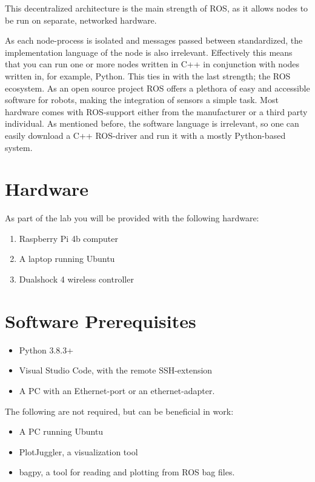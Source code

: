 \documentclass{ol-softwaremanual}
\begin{document}
This decentralized architecture is the main strength of ROS, as it allows nodes to be run on separate, networked hardware.

As each node-process is isolated and messages passed between standardized, the implementation language of the node is also irrelevant. Effectively this means that you can run one or more nodes written in C++ in conjunction with nodes written in, for example, Python. This ties in with the last strength; the ROS ecosystem. As an open source project ROS offers a plethora of easy and accessible software for robots, making the integration of sensors a simple task. Most hardware comes with ROS-support either from the manufacturer or a third party individual. As mentioned before, the software language is irrelevant, so one can easily download a C++ ROS-driver and run it with a mostly Python-based system. 

\section{Hardware}

As part of the lab you will be provided with the following hardware: 

\begin{enumerate}
    \item Raspberry Pi 4b computer
    \item A laptop running Ubuntu
    \item Dualshock 4 wireless controller
\end{enumerate}


\section{Software Prerequisites}
\begin{itemize}
    \item Python 3.8.3+
    \item Visual Studio Code, with the remote SSH-extension
    \item A PC with an Ethernet-port or an ethernet-adapter. 
\end{itemize}

The following are not required, but can be beneficial in work: 

\begin{itemize}
    \item A PC running Ubuntu
    \item PlotJuggler, a visualization tool
    \item bagpy, a tool for reading and plotting from ROS bag files.
\end{itemize}
\end{document}
